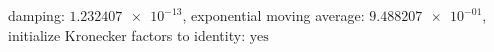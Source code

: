 damping: $\num[scientific-notation=true]{1.232407e-13}$, exponential moving average: $\num[scientific-notation=true]{9.488207e-01}$, initialize Kronecker factors to identity: $\text{yes}$